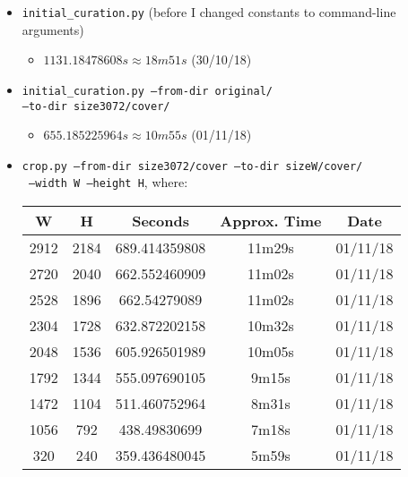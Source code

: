 \documentclass[11pt,a4paper]{report}
\begin{document}
\begin{itemize}

\item \texttt{initial\_curation.py} (before I changed constants to command-line arguments)
  \begin{itemize}
  \item $1131.18478608s \approx 18m51s$ (30/10/18)
  \end{itemize}

\item \texttt{initial\_curation.py --from-dir original/} \\ \texttt{--to-dir size3072/cover/}
  \begin{itemize}
  \item $655.185225964s \approx 10m55s$ (01/11/18)
  \end{itemize}

\item \texttt{crop.py --from-dir size3072/cover --to-dir sizeW/cover/} \\
         \texttt{ --width W --height H}, where:
  \begin{center}
  \begin{tabular}{ c c | c c | c }
  W & H & Seconds & Approx. Time & Date\\ \hline
  2912 & 2184 & 689.414359808 & 11m29s & 01/11/18 \\
  2720 & 2040 & 662.552460909 & 11m02s & 01/11/18 \\
  2528 & 1896 & 662.54279089 & 11m02s & 01/11/18 \\
  2304 & 1728 & 632.872202158 & 10m32s & 01/11/18 \\
  2048 & 1536 & 605.926501989 & 10m05s & 01/11/18 \\
  1792 & 1344 & 555.097690105 & 9m15s & 01/11/18 \\
  1472 & 1104 & 511.460752964 & 8m31s & 01/11/18 \\
  1056 & 792 & 438.49830699 & 7m18s & 01/11/18 \\
  320 & 240 & 359.436480045 & 5m59s & 01/11/18 \\
  \end{tabular}
  \end{center}


\end{itemize}
\end{document}
